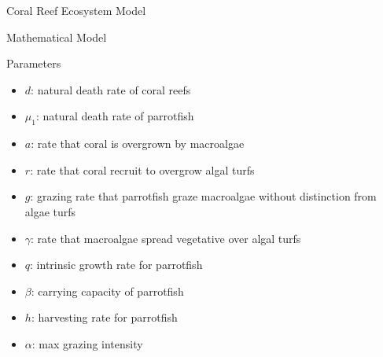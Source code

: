 \documentclass{beamer}
\begin{document}
\begin{frame}{Coral Reef Ecosystem Model}
\end{frame}

\begin{frame}{Mathematical Model}
    \begin{block}{Parameters}
    \begin{itemize}
        \item $d$: natural death rate of coral reefs
        \item $\mu_{1}$: natural death rate of parrotfish
        \item $a$: rate that coral is overgrown by macroalgae
        \item $r$: rate that coral recruit to overgrow algal turfs
        \item $g$: grazing rate that parrotfish graze macroalgae without distinction from algae turfs
        \item $\gamma$: rate that macroalgae spread vegetative over algal turfs
        \item $q$: intrinsic growth rate for parrotfish
        \item $\beta$: carrying capacity of parrotfish
        \item $h$: harvesting rate for parrotfish
        \item $\alpha$: max grazing intensity
    \end{itemize}
    \end{block}
\end{frame}
\end{document}

